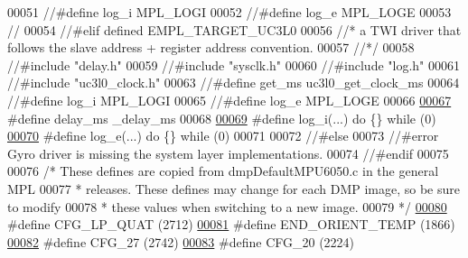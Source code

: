 \begin{DoxyCode}
00051 \textcolor{comment}{//#define log\_i       MPL\_LOGI}
00052 \textcolor{comment}{//#define log\_e       MPL\_LOGE}
00053 \textcolor{comment}{//}
00054 \textcolor{comment}{//#elif defined EMPL\_TARGET\_UC3L0}
00056 \textcolor{comment}{} \textcolor{comment}{//* a TWI driver that follows the slave address + register address convention.}
00057  \textcolor{comment}{//*/}
00058 \textcolor{comment}{//#include "delay.h"}
00059 \textcolor{comment}{//#include "sysclk.h"}
00060 \textcolor{comment}{//#include "log.h"}
00061 \textcolor{comment}{//#include "uc3l0\_clock.h"}
00063 \textcolor{comment}{}\textcolor{comment}{//#define get\_ms  uc3l0\_get\_clock\_ms}
00064 \textcolor{comment}{//#define log\_i       MPL\_LOGI}
00065 \textcolor{comment}{//#define log\_e       MPL\_LOGE}
00066 
\hypertarget{inv__mpu__dmp__motion__driver_8c_source.tex_l00067}{}\hyperlink{group___d_r_i_v_e_r_s_gae36aca5baf9b6b7d74992aef00686d67}{00067} \textcolor{preprocessor}{#define delay\_ms    \_delay\_ms}
00068 
\hypertarget{inv__mpu__dmp__motion__driver_8c_source.tex_l00069}{}\hyperlink{group___d_r_i_v_e_r_s_ga67fc07fa528d8e62dc7b88a847b563f5}{00069} \textcolor{preprocessor}{#define log\_i(...)     do \{\} while (0)}
\hypertarget{inv__mpu__dmp__motion__driver_8c_source.tex_l00070}{}\hyperlink{group___d_r_i_v_e_r_s_gac9308c888b394d1b403d9ba6e1f13fd2}{00070} \textcolor{preprocessor}{#define log\_e(...)     do \{\} while (0)}
00071 
00072 \textcolor{comment}{//#else}
00073 \textcolor{comment}{//#error  Gyro driver is missing the system layer implementations.}
00074 \textcolor{comment}{//#endif}
00075 
00076 \textcolor{comment}{/* These defines are copied from dmpDefaultMPU6050.c in the general MPL}
00077 \textcolor{comment}{ * releases. These defines may change for each DMP image, so be sure to modify}
00078 \textcolor{comment}{ * these values when switching to a new image.}
00079 \textcolor{comment}{ */}
\hypertarget{inv__mpu__dmp__motion__driver_8c_source.tex_l00080}{}\hyperlink{group___d_r_i_v_e_r_s_gadf5652e51b8c08c2eb6a902d1d1f319c}{00080} \textcolor{preprocessor}{#define CFG\_LP\_QUAT             (2712)}
\hypertarget{inv__mpu__dmp__motion__driver_8c_source.tex_l00081}{}\hyperlink{group___d_r_i_v_e_r_s_ga5c2c9516862587e8e1aa8c0c428076d9}{00081} \textcolor{preprocessor}{#define END\_ORIENT\_TEMP         (1866)}
\hypertarget{inv__mpu__dmp__motion__driver_8c_source.tex_l00082}{}\hyperlink{group___d_r_i_v_e_r_s_gaae53afa64170cb4723c04f16c2fa5f30}{00082} \textcolor{preprocessor}{#define CFG\_27                  (2742)}
\hypertarget{inv__mpu__dmp__motion__driver_8c_source.tex_l00083}{}\hyperlink{group___d_r_i_v_e_r_s_ga12aa4c3bdc65c24ca29ef08e62fd3e13}{00083} \textcolor{preprocessor}{#define CFG\_20                  (2224)}

\end{DoxyCode}
